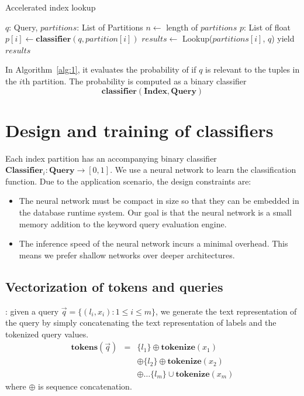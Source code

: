 \documentclass[conference]{IEEEtran}
\begin{document}
\begin{algorithm}
	\label{alg:1}
\caption{Accelerated index lookup}
\begin{algorithmic}[1]
\REQUIRE $q$: Query, $partitions$: List of Partitions
\STATE $n \leftarrow$ length of $partitions$
\STATE $p$: List of float
  \STATE $p[i] \leftarrow \mathbf{classifier}(q, partition[i])$
\ENDFOR
{}
    \STATE $results \leftarrow$ Lookup($partitions[i]$, $q$)
    \STATE yield $results$
\ENDFOR
\end{algorithmic}
\end{algorithm}

In Algorithm~\ref{alg:1}, it evaluates the probability of if $q$
is relevant to the tuples in the $i$th partition.  The probability
is computed as a binary classifier 
$$\mathbf{classifier}(\mathbf{Index}, \mathbf{Query})$$

\section{Design and training of classifiers}

Each index partition has an accompanying binary classifier $\mathbf{Classifier}_i : \mathbf{Query}\to[0, 1]$.
We use a neural network to learn the classification function.  Due to the application
scenario, the design constraints are:

\begin{itemize}
\item The neural network must be compact in size so that they can be embedded in
	the database runtime system.  Our goal is that the neural network is a small
	memory addition to the keyword query evaluation engine.
\item The inference speed of the neural network incurs a minimal overhead.  This means
	we prefer shallow networks over deeper architectures.
\end{itemize}

\subsection{Vectorization of tokens and queries}

:  given a query $\vec q=\{(l_i,
x_i): 1\leq i \leq m\}$, we generate the text representation of the query by
simply concatenating the text representation of labels and the tokenized query
values.
\begin{eqnarray*}
	\mathbf{tokens}(\vec q) &=& \{l_1\} \oplus \mathbf{tokenize}(x_1)  \\
				&&  \oplus \{l_2\} \oplus \mathbf{tokenize}(x_2) \\
				&& \oplus \dots \{l_m\} \cup \mathbf{tokenize}(x_m)
\end{eqnarray*}
where $\oplus$ is sequence concatenation.
\end{document}
